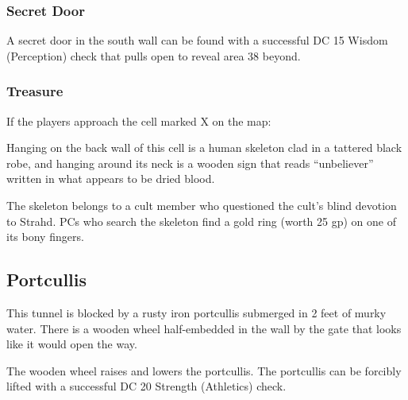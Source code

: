 \subsubsection*{Secret Door}
A secret door in the south wall can be found with a successful DC 15 Wisdom (Perception) check that pulls
open to reveal area 38 beyond.

\subsubsection*{Treasure}
If the players approach the cell marked X on the map:
\begin{readout}
  Hanging on the back wall of this cell is a human skeleton clad in a tattered black robe, and hanging around 
  its neck is a wooden sign that reads ``unbeliever'' written in what appears to be dried blood.
\end{readout}
The skeleton belongs to a cult member who questioned the cult's blind devotion to Strahd. PCs who search the
skeleton find a gold ring (worth 25 gp) on one of its bony fingers.

\begin{arealinks}
\end{arealinks}


\pagebreak
\subsection{Portcullis}
\label{sec:Portcullis}
\begin{readout}
  This tunnel is blocked by a rusty iron portcullis submerged in 2 feet of murky water. There is a wooden
  wheel half-embedded in the wall by the gate that looks like it would open the way.
\end{readout}
The wooden wheel raises and lowers the portcullis. The portcullis can be forcibly lifted with a successful
DC 20 Strength (Athletics) check.

\begin{arealinks}
\end{arealinks}


\pagebreak
